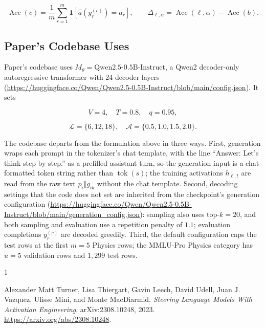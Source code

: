 \documentclass{article}
\begin{document}
\[
\operatorname{Acc}(c)=\frac1m\sum_{r=1}^{m}\mathbf 1[\hat a(y_r^{(c)})=a_r],
\qquad
\Delta_{\ell,\alpha}=\operatorname{Acc}(\ell,\alpha)-\operatorname{Acc}(b).
\]

\subsection*{Paper's Codebase Uses}

Paper's codebase uses \(M_\theta=\text{Qwen2.5-0.5B-Instruct}\), a Qwen2 decoder-only autoregressive transformer with 24 decoder layers (\url{https://huggingface.co/Qwen/Qwen2.5-0.5B-Instruct/blob/main/config.json}).
It sets

\[
V=4,\quad
T=0.8,\quad
q=0.95,
\]

\[
\mathcal L=\{6,12,18\},\quad
\mathcal A=\{0.5,1.0,1.5,2.0\}.
\]

The codebase departs from the formulation above in three ways.
First, generation wraps each prompt in the tokenizer's chat template, with the line ``Answer: Let's think step by step.'' as a prefilled assistant turn, so the generation input is a chat-formatted token string rather than \(\operatorname{tok}(s)\); the training activations \(h_{\ell,t}\) are read from the raw text \(p_i\Vert g_{ik}\) without the chat template.
Second, decoding settings that the code does not set are inherited from the checkpoint's generation configuration (\url{https://huggingface.co/Qwen/Qwen2.5-0.5B-Instruct/blob/main/generation_config.json}): sampling also uses \(\text{top-}k=20\), and both sampling and evaluation use a repetition penalty of \(1.1\); evaluation completions \(y_r^{(c)}\) are decoded greedily.
Third, the default configuration caps the test rows at the first \(m=5\) Physics rows; the MMLU-Pro Physics category has \(u=5\) validation rows and \(1{,}299\) test rows.

\begin{thebibliography}{1}

Alexander Matt Turner, Lisa Thiergart, Gavin Leech, David Udell, Juan J. Vazquez, Ulisse Mini, and Monte MacDiarmid.
\emph{Steering Language Models With Activation Engineering}.
arXiv:2308.10248, 2023.
\url{https://arxiv.org/abs/2308.10248}.

\end{thebibliography}
\end{document}
